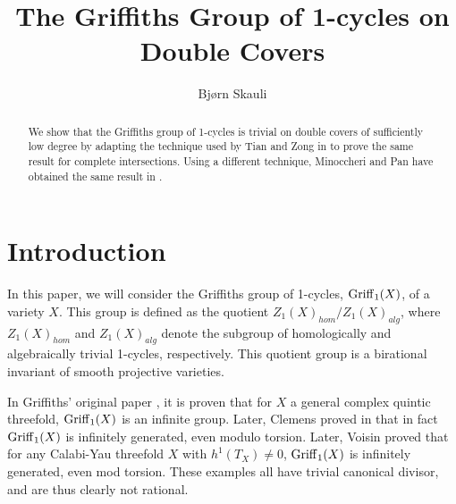 \title{The Griffiths Group of 1-cycles on Double Covers}
\author{Bjørn Skauli}
\date{}
\maketitle
\label{pap:griffiths}

\begin{abstract}
  We show that the Griffiths group of 1-cycles is trivial on double covers of sufficiently low degree by adapting the technique used by Tian and Zong in \cite{TZ} to prove the same result for complete intersections. Using a different technique, Minoccheri and Pan have obtained the same result in \cite{MP}.
\end{abstract}
\section{Introduction}

In this paper, we will consider the Griffiths group of 1-cycles, $\operatorname{Griff}_1(X)$, of a variety $X$. This group is defined as the quotient $Z_1(X)_{hom}/Z_1(X)_{alg}$, where $Z_1(X)_{hom}$ and $Z_1(X)_{alg}$ denote the subgroup of homologically and algebraically trivial 1-cycles, respectively. This quotient group is a birational invariant of smooth projective varieties.

In Griffiths' original paper \cite{GriffithsPeriodsRational}, it is proven that for $X$ a general complex quintic threefold, $\operatorname{Griff}_1(X)$ is an infinite group. Later, Clemens proved in \cite{ClemensNotFinitelyGenerated} that in fact $\operatorname{Griff}_1(X)$ is infinitely generated, even modulo torsion. Later, Voisin proved that for any Calabi-Yau threefold $X$ with $h^1(T_X) \neq 0$, $\operatorname{Griff}_1(X)$ is infinitely generated, even mod torsion.
These examples all have trivial canonical divisor, and are thus clearly not rational.

